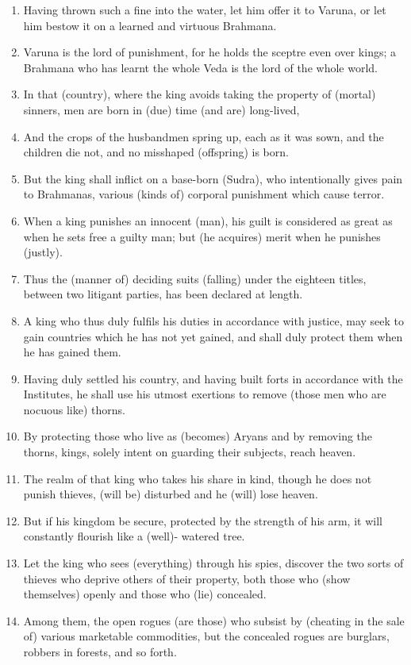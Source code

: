 \begin{enumerate}
\item Having thrown such a fine into the water, let him offer it to Varuna, or let him bestow it on a learned and virtuous Brahmana.
\item Varuna is the lord of punishment, for he holds the sceptre even over kings; a Brahmana who has learnt the whole Veda is the lord of the whole world.
\item In that (country), where the king avoids taking the property of (mortal) sinners, men are born in (due) time (and are) long-lived,
\item And the crops of the husbandmen spring up, each as it was sown, and the children die not, and no misshaped (offspring) is born.
\item But the king shall inflict on a base-born (Sudra), who intentionally gives pain to Brahmanas, various (kinds of) corporal punishment which cause terror.
\item When a king punishes an innocent (man), his guilt is considered as great as when he sets free a guilty man; but (he acquires) merit when he punishes (justly).
\item Thus the (manner of) deciding suits (falling) under the eighteen titles, between two litigant parties, has been declared at length.
\item A king who thus duly fulfils his duties in accordance with justice, may seek to gain countries which he has not yet gained, and shall duly protect them when he has gained them.
\item Having duly settled his country, and having built forts in accordance with the Institutes, he shall use his utmost exertions to remove (those men who are nocuous like) thorns.
\item By protecting those who live as (becomes) Aryans and by removing the thorns, kings, solely intent on guarding their subjects, reach heaven.
\item The realm of that king who takes his share in kind, though he does not punish thieves, (will be) disturbed and he (will) lose heaven.
\item But if his kingdom be secure, protected by the strength of his arm, it will constantly flourish like a (well)- watered tree.
\item Let the king who sees (everything) through his spies, discover the two sorts of thieves who deprive others of their property, both those who (show themselves) openly and those who (lie) concealed.
\item Among them, the open rogues (are those) who subsist by (cheating in the sale of) various marketable commodities, but the concealed rogues are burglars, robbers in forests, and so forth.

\end{enumerate}
